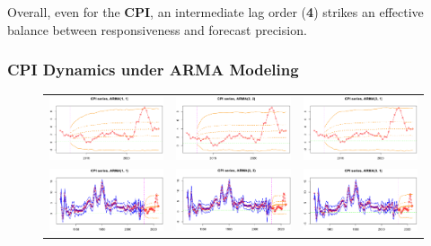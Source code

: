 \documentclass{Configuration_Files/PoliMi3i_thesis}
\begin{document}
Overall, even for the \textbf{CPI}, an intermediate lag order (\textbf{4}) strikes an effective balance between responsiveness and forecast precision.



\subsubsection{CPI Dynamics under ARMA Modeling}

\begin{figure}[H]
  \centering
  \begin{tabular}{@{}ccc@{}}
    \includegraphics[angle=90,width=0.3\linewidth]{CPI_ZARMA(1,1).png} &
    \includegraphics[angle=90,width=0.302\linewidth]{CPI_ZARMA(2,2).png} &
    \includegraphics[angle=90,width=0.305\linewidth]{CPI_ZARMA(3,1).png} \\
    \includegraphics[angle=90,width=0.3\linewidth]{CPI_FARMA(1,1).png} &
    \includegraphics[angle=90,width=0.3\linewidth]{CPI_FARMA(2,2).png} &
    \includegraphics[angle=90,width=0.29\linewidth]{CPI_FARMA(3,1).png}
  \end{tabular}
\end{figure}
\newpage
\end{document}
